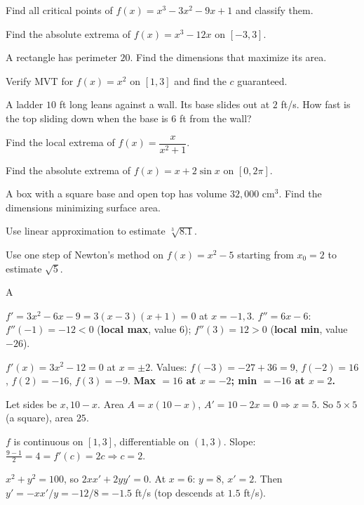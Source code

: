 \documentclass[11pt]{article}
\begin{document}
\begin{problems}
\item Find all critical points of $f(x) = x^3 - 3x^2 - 9x + 1$ and classify them.
\item Find the absolute extrema of $f(x) = x^3 - 12x$ on $[-3, 3]$.
\item A rectangle has perimeter $20$. Find the dimensions that maximize its area.
\item Verify MVT for $f(x) = x^2$ on $[1, 3]$ and find the $c$ guaranteed.
\item A ladder $10$ ft long leans against a wall. Its base slides out at $2$ ft/s. How fast is the top sliding down when the base is $6$ ft from the wall?
\end{problems}

\vfill
\newpage
{}
\begin{problems}
\item Find the local extrema of $f(x) = \dfrac{x}{x^2 + 1}$.
\item Find the absolute extrema of $f(x) = x + 2 \sin x$ on $[0, 2\pi]$.
\item A box with a square base and open top has volume $32{,}000$ cm$^3$. Find the dimensions minimizing surface area.
\item Use linear approximation to estimate $\sqrt[3]{8.1}$.
\item Use one step of Newton's method on $f(x) = x^2 - 5$ starting from $x_0 = 2$ to estimate $\sqrt 5$.
\end{problems}

\vfill
\newpage
{}

\begin{answers}{A}
\item $f' = 3x^2 - 6x - 9 = 3(x-3)(x+1) = 0$ at $x = -1, 3$. $f'' = 6x - 6$: $f''(-1) = -12 < 0$ (\textbf{local max}, value $6$); $f''(3) = 12 > 0$ (\textbf{local min}, value $-26$).
\item $f'(x) = 3x^2 - 12 = 0$ at $x = \pm 2$. Values: $f(-3) = -27 + 36 = 9$, $f(-2) = 16$, $f(2) = -16$, $f(3) = -9$. \textbf{Max $=16$ at $x=-2$; min $=-16$ at $x=2$.}
\item Let sides be $x, 10-x$. Area $A = x(10-x)$, $A' = 10 - 2x = 0 \Rightarrow x = 5$. So $\boxed{5 \times 5}$ (a square), area $25$.
\item $f$ is continuous on $[1,3]$, differentiable on $(1,3)$. Slope: $\tfrac{9-1}{2} = 4 = f'(c) = 2c \Rightarrow \boxed{c = 2}$.
\item $x^2 + y^2 = 100$, so $2x x' + 2y y' = 0$. At $x=6$: $y = 8$, $x' = 2$. Then $y' = -x x'/y = -12/8 = \boxed{-1.5}$ ft/s (top descends at $1.5$ ft/s).
\end{answers}
\end{document}
